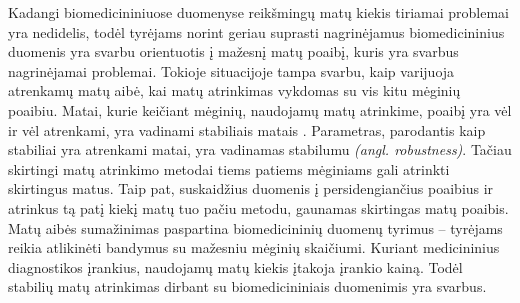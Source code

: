

Kadangi biomedicininiuose duomenyse reikšmingų matų kiekis tiriamai problemai yra nedidelis, todėl tyrėjams norint geriau suprasti nagrinėjamus biomedicininius duomenis yra svarbu orientuotis į mažesnį matų poaibį, kuris yra svarbus nagrinėjamai problemai. Tokioje situacijoje tampa svarbu, kaip varijuoja atrenkamų matų aibė, kai matų atrinkimas vykdomas su vis kitu mėginių poaibiu. Matai, kurie keičiant mėginių, naudojamų matų atrinkime, poaibį yra vėl ir vėl atrenkami, yra vadinami stabiliais matais \cite{devijver1982pattern}. Parametras, parodantis kaip stabiliai yra atrenkami matai, yra vadinamas stabilumu \textit{(angl. robustness)}. Tačiau skirtingi matų atrinkimo metodai tiems patiems mėginiams gali atrinkti skirtingus matus. Taip pat, suskaidžius duomenis į persidengiančius poaibius ir atrinkus tą patį kiekį matų tuo pačiu metodu, gaunamas skirtingas matų poaibis. Matų aibės sumažinimas paspartina biomedicininių duomenų tyrimus -- tyrėjams reikia atlikinėti bandymus su mažesniu mėginių skaičiumi. 
Kuriant medicininius diagnostikos įrankius, naudojamų matų kiekis įtakoja įrankio kainą. Todėl stabilių matų atrinkimas dirbant su biomedicininiais duomenimis yra svarbus.



